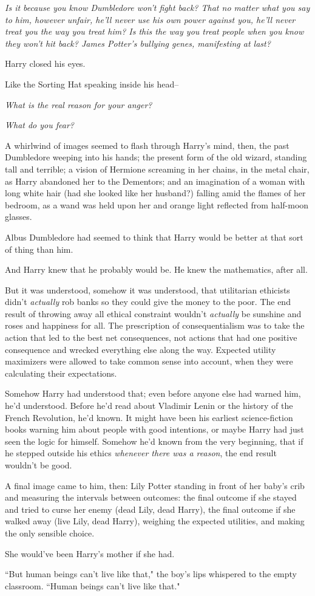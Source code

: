 \emph{Is it because you know Dumbledore won't fight back? That no matter what you say to him, however unfair, he'll never use his own power against you, he'll never treat you the way you treat him? Is this the way you treat people when you know they won't hit back? James Potter's bullying genes, manifesting at last?}

Harry closed his eyes.

Like the Sorting Hat speaking inside his head\---

\emph{What is the real reason for your anger?}

\emph{What do you fear?}

A whirlwind of images seemed to flash through Harry's mind, then, the past Dumbledore weeping into his hands; the present form of the old wizard, standing tall and terrible; a vision of Hermione screaming in her chains, in the metal chair, as Harry abandoned her to the Dementors; and an imagination of a woman with long white hair (had she looked like her husband?) falling amid the flames of her bedroom, as a wand was held upon her and orange light reflected from half-moon glasses.

Albus Dumbledore had seemed to think that Harry would be better at that sort of thing than him.

And Harry knew that he probably would be. He knew the mathematics, after all.

But it was understood, somehow it was understood, that utilitarian ethicists didn't \emph{actually} rob banks so they could give the money to the poor. The end result of throwing away all ethical constraint wouldn't \emph{actually} be sunshine and roses and happiness for all. The prescription of consequentialism was to take the action that led to the best net consequences, not actions that had one positive consequence and wrecked everything else along the way. Expected utility maximizers were allowed to take common sense into account, when they were calculating their expectations.

Somehow Harry had understood that; even before anyone else had warned him, he'd understood. Before he'd read about Vladimir Lenin or the history of the French Revolution, he'd known. It might have been his earliest science-fiction books warning him about people with good intentions, or maybe Harry had just seen the logic for himself. Somehow he'd known from the very beginning, that if he stepped outside his ethics \emph{whenever there was a reason}, the end result wouldn't be good.

A final image came to him, then: Lily Potter standing in front of her baby's crib and measuring the intervals between outcomes: the final outcome if she stayed and tried to curse her enemy (dead Lily, dead Harry), the final outcome if she walked away (live Lily, dead Harry), weighing the expected utilities, and making the only sensible choice.

She would've been Harry's mother if she had.

``But human beings can't live like that," the boy's lips whispered to the empty classroom. ``Human beings can't live like that."

